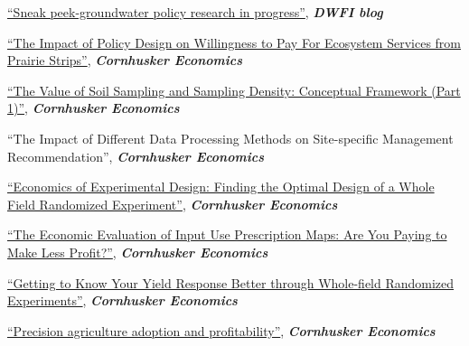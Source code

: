 \documentclass[10pt,margin,line]{res}
\newenvironment{list1}{
  \begin{list}{\ding{113}}{%
      \setlength{\itemsep}{0in}
      \setlength{\parsep}{0in} \setlength{\parskip}{0in}
      \setlength{\topsep}{0in} \setlength{\partopsep}{0in}
      \setlength{\leftmargin}{0.17in}}}{\end{list}}
\newenvironment{list2}{
  \begin{list}{-}{%
      \setlength{\itemsep}{0in}
      \setlength{\parsep}{0in} \setlength{\parskip}{0in}
      \setlength{\topsep}{0in} \setlength{\partopsep}{0in}
      \setlength{\leftmargin}{0.2in}}}{\end{list}}
\begin{document}
\begin{resume}
\begin{list1}
\begin{list2}
  \item \href{https://waterforfood.nebraska.edu/news-and-events/news/2023/11/sneak-peek---groundwater-policy-research-in-progress}{``Sneak peek-groundwater policy research in progress''}, \textit{\textbf{DWFI blog}}
  \item \href{https://agecon.unl.edu/impact-policy-design-willingness-pay-ecosystem-services-prairie-strips}{``The Impact of Policy Design on Willingness to Pay For Ecosystem Services from Prairie Strips''}, \textit{\textbf{Cornhusker Economics}}
  \item \href{https://agecon.unl.edu/cornhusker-economics/2020/value-soil-sampling-and-sampling-density-conceptual-framework-part-1}{``The Value of Soil Sampling and Sampling Density: Conceptual Framework (Part 1)''}, \textit{\textbf{Cornhusker Economics}}
  \item ``The Impact of Different Data Processing Methods on Site-specific Management Recommendation'', \textit{\textbf{Cornhusker Economics}}
  \item \href{https://agecon.unl.edu/cornhusker-economics/2018/experimental-design-economics}{``Economics of Experimental Design: Finding the Optimal Design of a Whole Field Randomized Experiment''}, \textit{\textbf{Cornhusker Economics}}
  \item \href{https://cropwatch.unl.edu/2019/economic-evaluation-input-use-prescription-maps-are-you-paying-make-less-profit}{``The Economic Evaluation of Input Use Prescription Maps: Are You Paying to Make Less Profit?''}, \textit{\textbf{Cornhusker Economics}}
  \item \href{https://agecon.unl.edu/cornhusker-economics/2017/yield-response-whole-field-randomized-experiments}{``Getting to Know Your Yield Response Better through Whole-field Randomized Experiments''}, \textit{\textbf{Cornhusker Economics}}
  \item \href{https://agecon.unl.edu/cornhusker-economics/2017/precision-agriculture-adoption-profitability}{``Precision agriculture adoption and profitability''}, \textit{\textbf{Cornhusker Economics}}
  \end{list2}
\end{list1}


\end{resume}
\end{document}
